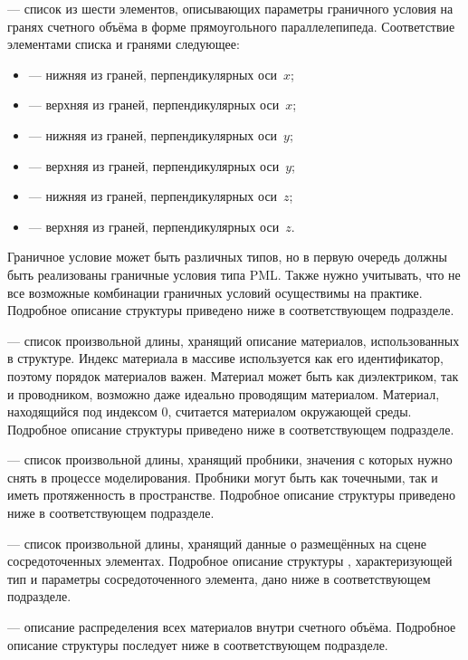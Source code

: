  --- список из шести элементов, описывающих параметры
граничного условия на гранях счетного объёма в форме прямоугольного
параллелепипеда. Соответствие элементами списка и гранями следующее:
\begin{itemize}
\item {} --- нижняя из граней, перпендикулярных оси~$x$;
\item {} --- верхняя из граней, перпендикулярных оси~$x$;
\item {} --- нижняя из граней, перпендикулярных оси~$y$;
\item {} --- верхняя из граней, перпендикулярных оси~$y$;
\item {} --- нижняя из граней, перпендикулярных оси~$z$;
\item {} --- верхняя из граней, перпендикулярных оси~$z$.
\end{itemize}
Граничное условие может быть различных типов, но в первую очередь должны быть
реализованы граничные условия типа PML. Также нужно учитывать, что не все
возможные комбинации граничных условий осуществимы на практике. Подробное
описание структуры  приведено ниже в соответствующем подразделе.

 --- список произвольной длины, хранящий описание материалов,
использованных в структуре. Индекс материала в массиве используется как его
идентификатор, поэтому порядок материалов важен. Материал может быть как
диэлектриком, так и проводником, возможно даже идеально проводящим материалом.
Материал, находящийся под индексом 0, считается материалом окружающей среды.
Подробное описание структуры  приведено ниже в соответствующем
подразделе.

 --- список произвольной длины, хранящий пробники, значения
с которых нужно снять в процессе моделирования. Пробники могут быть как
точечными, так и иметь протяженность в пространстве. Подробное описание
структуры  приведено ниже в соответствующем подразделе.

 --- список произвольной длины, хранящий данные о размещённых
на сцене сосредоточенных элементах. Подробное описание структуры ,
характеризующей тип и параметры сосредоточенного элемента, дано ниже
в соответствующем подразделе.

 --- описание распределения всех материалов внутри счетного
объёма. Подробное описание структуры  последует ниже
в соответствующем подразделе.


